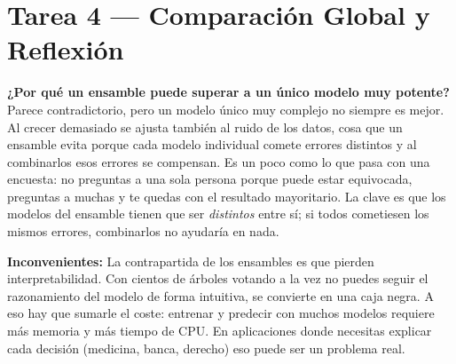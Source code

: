 \documentclass[../../__memoria.tex]{subfiles}
\begin{document}
\section[Comparación y Reflexión]{Tarea 4 --- Comparación Global y Reflexión}

\begin{table}[H]
    \centering
    \caption{Comparativa de los tres modelos evaluados.}
\end{table}

\textbf{¿Por qué un ensamble puede superar a un único modelo muy potente?} \\
Parece contradictorio, pero un modelo único muy complejo no siempre es mejor. Al crecer demasiado se ajusta también al ruido de los datos, cosa que un ensamble evita porque cada modelo individual comete errores distintos y al combinarlos esos errores se compensan. Es un poco como lo que pasa con una encuesta: no preguntas a una sola persona porque puede estar equivocada, preguntas a muchas y te quedas con el resultado mayoritario. La clave es que los modelos del ensamble tienen que ser \textit{distintos} entre sí; si todos cometiesen los mismos errores, combinarlos no ayudaría en nada.

\vspace{0.3cm}

\textbf{Inconvenientes:}
La contrapartida de los ensambles es que pierden interpretabilidad. Con cientos de árboles votando a la vez no puedes seguir el razonamiento del modelo de forma intuitiva, se convierte en una caja negra. A eso hay que sumarle el coste: entrenar y predecir con muchos modelos requiere más memoria y más tiempo de CPU. En aplicaciones donde necesitas explicar cada decisión (medicina, banca, derecho) eso puede ser un problema real.
\end{document}
